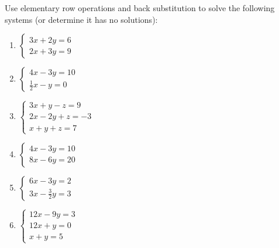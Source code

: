 \documentclass[11pt]{exam}
\begin{document}
\begin{questions}
        \vspace{20px}
        \item Use elementary row operations and back substitution to solve the following systems (or determine it has no solutions):
        \begin{enumerate}
            \item $\begin{cases}
                3x + 2y = 6 \\
                2x + 3y = 9
            \end{cases}$
            \item $\begin{cases}
                4x - 3y = 10 \\
                \frac{1}{2}x - y = 0
            \end{cases}$
            \item $\begin{cases}
                3x + y - z = 9 \\
                2x - 2y + z = -3 \\
                x + y + z = 7
            \end{cases}$
            \item $\begin{cases}
                4x - 3y = 10 \\
                8x - 6y = 20
            \end{cases}$
            \item $\begin{cases}
                6x - 3y = 2 \\
                3x - \frac{3}{2}y = 3
            \end{cases}$
            \item $\begin{cases}
                12x - 9y = 3 \\
                12x + y = 0 \\
                x + y = 5
            \end{cases}$
        \end{enumerate}
    \end{questions}

\pagebreak
\end{document}
